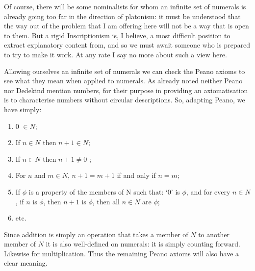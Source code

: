 \documentclass[11pt,oneside,a4paper]{article}
\begin{document}
Of course, there will be some nominalists for whom an infinite set of numerals is already going too far in the direction of platonism: it must be understood that the way out of the problem that I am offering here will not be a way that is open to them. But a rigid Inscriptionism is, I believe, a most difficult position to extract explanatory content from, and so we must await someone who is prepared to try to make it work. At any rate I say no more about such a view here.

Allowing ourselves an infinite set of numerals we can check the Peano axioms to see what they mean when applied to numerals. As already noted neither Peano nor Dedekind mention numbers, for their purpose in providing an axiomatisation is to characterise numbers without circular descriptions. So, adapting Peano, we have simply:

\begin{enumerate}[label=P*\Roman* :]

  \item 0 $\in N$;
  
  \item If $n \in N$ then $n + 1 \in N$;
  
  \item If $n \in N$ then $n + 1 \neq 0$ ;
  
  \item For $n$ and $m \in N$, $n + 1 = m + 1$ if and only if $n = m$;
  
  \item If $\phi$ is a property of the members of N such that: `0' is $\phi$, and for every $n \in N$, if $n$ is $\phi$, then $n + 1$ is $\phi$, then all $n \in N$ are $\phi$;
  
  \item etc.
  \end{enumerate}
Since addition is simply an operation that takes a member of $N$ to another member of $N$ it is also well-defined on numerals: it is simply counting forward. Likewise for multiplication. Thus the remaining Peano axioms will also have a clear meaning.
\end{document}
